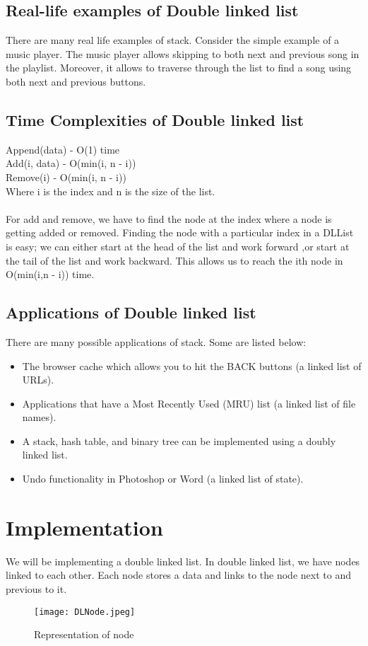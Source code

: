 \documentclass[11pt,fleqn]{book} %
\begin{document}
\subsection{Real-life examples of Double linked list}
There are many real life examples of stack. Consider the simple example of a music player. The music player allows skipping to both next and previous song in the playlist. Moreover, it allows to traverse through the list to find a song using both next and previous buttons.

\subsection{Time Complexities of Double linked list}
Append(data) - O(1) time \\
Add(i, data) - O(min(i, n - i))\\
Remove(i) - O(min(i, n - i))\\ 
Where i is the index and n is the size of the list.\\ \\
For add and remove, we have to find the node at the index where a node is getting added or removed. Finding the node with a particular index in a DLList is easy; we can either start at the head of the list and work forward ,or start at the tail of the list and work backward. This allows us to reach the ith node in O(min(i,n - i)) time.

\subsection{Applications of Double linked list}
There are many possible applications of stack. Some are listed below:
\begin{itemize}
	\item The browser cache which allows you to hit the BACK buttons (a linked list of URLs).
	\item Applications that have a Most Recently Used (MRU) list (a linked list of file names).
	\item A stack, hash table, and binary tree can be implemented using a doubly linked list. 
	\item Undo functionality in Photoshop or Word (a linked list of state).
\end{itemize}

\section{Implementation}
We will be implementing a double linked list. In double linked list, we have nodes linked to each other.
Each node stores a data and links to the node next to and previous to it.
\begin{figure}[H]
	\centering
	\texttt{[image: DLNode.jpeg]}
	\caption{Representation of node}
\end{figure}
\end{document}
